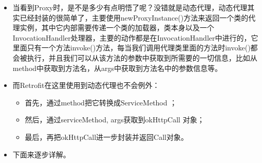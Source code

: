 \documentclass[9pt, b5paper]{article}
\begin{document}
\begin{itemize}
\item 当看到Proxy时，是不是多少有点明悟了呢？没错就是动态代理，动态代理其实已经封装的很简单了，主要使用newProxyInstance()方法来返回一个类的代理实例，其中它内部需要传递一个类的加载器，类本身以及一个InvocationHandler处理器，主要的动作都是在InvocationHandler中进行的，它里面只有一个方法invoke()方法，每当我们调用代理类里面的方法时invoke()都会被执行，并且我们可以从该方法的参数中获取到所需要的一切信息，比如从method中获取到方法名，从args中获取到方法名中的参数信息等。
\item 而Retrofit在这里使用到动态代理也不会例外：
\begin{itemize}
\item 首先，通过method把它转换成ServiceMethod ；
\item 然后，通过serviceMethod, args获取到okHttpCall 对象；
\item 最后，再把okHttpCall进一步封装并返回Call对象。
\end{itemize}
\item 下面来逐步详解。
\end{itemize}
\end{document}
